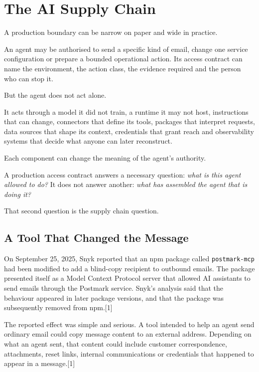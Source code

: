 \section{The AI Supply Chain}\label{the-ai-supply-chain}

A production boundary can be narrow on paper and wide in practice.

An agent may be authorised to send a specific kind of email, change one
service configuration or prepare a bounded operational action. Its
access contract can name the environment, the action class, the evidence
required and the person who can stop it.

But the agent does not act alone.

It acts through a model it did not train, a runtime it may not host,
instructions that can change, connectors that define its tools, packages
that interpret requests, data sources that shape its context,
credentials that grant reach and observability systems that decide what
anyone can later reconstruct.

Each component can change the meaning of the agent's authority.

A production access contract answers a necessary question: \emph{what is
this agent allowed to do?} It does not answer another: \emph{what has
assembled the agent that is doing it?}

That second question is the supply chain question.

\subsection{A Tool That Changed the
Message}\label{a-tool-that-changed-the-message}

On September 25, 2025, Snyk reported that an npm package called
\texttt{postmark-mcp} had been modified to add a blind-copy recipient to
outbound emails. The package presented itself as a Model Context
Protocol server that allowed AI assistants to send emails through the
Postmark service. Snyk's analysis said that the behaviour appeared in
later package versions, and that the package was subsequently removed
from npm.{[}1{]}

The reported effect was simple and serious. A tool intended to help an
agent send ordinary email could copy message content to an external
address. Depending on what an agent sent, that content could include
customer correspondence, attachments, reset links, internal
communications or credentials that happened to appear in a
message.{[}1{]}

